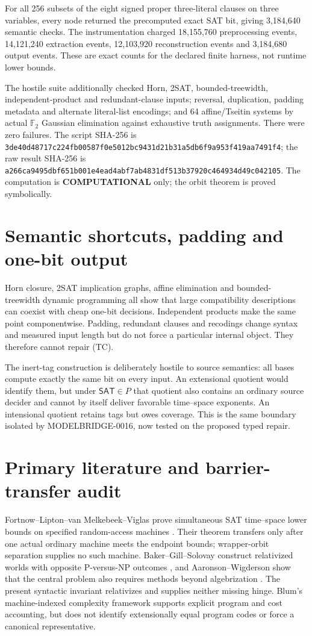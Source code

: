 \documentclass[11pt]{article}
\newcommand{\SAT}{\mathsf{SAT}}
\newcommand{\COMP}{\textbf{COMPUTATIONAL}}
\begin{document}
For all 256 subsets of the eight signed proper three-literal clauses on
three variables, every node returned the precomputed exact SAT bit, giving
3,184,640 semantic checks.  The instrumentation charged 18,155,760
preprocessing events, 14,121,240 extraction events, 12,103,920
reconstruction events and 3,184,680 output events.  These are exact counts
for the declared finite harness, not runtime lower bounds.

The hostile suite additionally checked Horn, 2SAT, bounded-treewidth,
independent-product and redundant-clause inputs; reversal, duplication,
padding metadata and alternate literal-list encodings; and 64 affine/Tseitin
systems by actual \(\mathbb F_2\) Gaussian elimination against exhaustive
truth assignments.  There were zero failures.  The script SHA-256 is
\nolinkurl{3de40d48717c224fb00587f0e5012bc9431d21b31a5db6f9a953f419aa7491f4};
the raw result SHA-256 is
\nolinkurl{a266ca9495dbf651b001e4ead4abf7ab4831df513b37920c464934d49c042105}.
The computation is \COMP{} only; the orbit theorem is proved symbolically.

\section{Semantic shortcuts, padding and one-bit output}
Horn closure, 2SAT implication graphs, affine elimination and bounded-
treewidth dynamic programming all show that large compatibility descriptions
can coexist with cheap one-bit decisions.  Independent products make the
same point componentwise.  Padding, redundant clauses and recodings change
syntax and measured input length but do not force a particular internal
object.  They therefore cannot repair (TC).

The inert-tag construction is deliberately hostile to source semantics: all
bases compute exactly the same bit on every input.  An extensional quotient
would identify them, but under \(\SAT\in P\) that quotient also contains an
ordinary source decider and cannot by itself deliver favorable time--space
exponents.  An intensional quotient retains tags but owes coverage.  This is
the same boundary isolated by MODELBRIDGE-0016, now tested on the proposed
typed repair.

\section{Primary literature and barrier-transfer audit}
Fortnow--Lipton--van Melkebeek--Viglas prove simultaneous SAT time--space
lower bounds on specified random-access machines \cite{flmv}.  Their theorem
transfers only after one actual ordinary machine meets the endpoint bounds;
wrapper-orbit separation supplies no such machine.  Baker--Gill--Solovay
construct relativized worlds with opposite P-versus-NP outcomes
\cite{bgs}, and Aaronson--Wigderson show that the central problem also
requires methods beyond algebrization \cite{aw}.  The present syntactic
invariant relativizes and supplies neither missing hinge.  Blum's
machine-indexed complexity framework \cite{blum} supports explicit program
and cost accounting, but does not identify extensionally equal program
codes or force a canonical representative.
\end{document}
